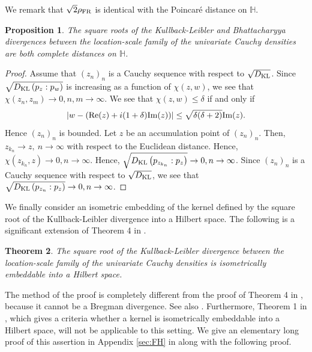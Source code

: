\documentclass[journal]{IEEEtran}
\newtheorem{theorem}{Theorem}
\newtheorem{proposition}[theorem]{Proposition}
\begin{document}
We remark that $\sqrt{2}\rho_{\textup{FR}}$ is identical with the Poincar\'e distance on $\mathbb H$.  



\begin{proposition}\label{prop:complete}
The square roots of the Kullback-Leibler and Bhattacharyya divergences between the location-scale family of the univariate Cauchy densities are both complete distances on $\mathbb H$. 
\end{proposition}

\begin{proof}
Assume that $(z_n)_n$ is a Cauchy sequence with respect to $ \sqrt{D_{\textup{KL}}}$. 
Since $\sqrt{D_{\textup{KL}}\left(p_{z} : p_{w}\right)}$ is increasing as a function of  $\chi(z,w)$, 
we see that 
$\chi(z_n, z_m) \to 0, n,m \to \infty$. 
We see that 
$\chi(z,w) \le \delta$ if and only if 
$$\left|w - (\textup{Re}(z) + i (1+\delta)\textup{Im}(z)) \right| \le \sqrt{\delta (\delta+2)} \textup{Im}(z). $$
Hence $(z_n)_n$ is bounded. 
Let $z$ be an accumulation point of $(z_n)_n$. 
Then, $z_{k_n} \to z, \ n \to \infty$ with respect to the Euclidean distance. 
Hence, 
$\chi(z_{k_n}, z) \to 0, n \to \infty$. 
Hence, 
$\sqrt{D_{\textup{KL}}\left(p_{z_{k_n}} : p_{z}\right)} \to 0, n \to \infty$. 
Since $(z_n)_n$ is a Cauchy sequence with respect to $ \sqrt{D_{\textup{KL}}}$, 
we see that 
$\sqrt{D_{\textup{KL}}\left(p_{z_{n}} : p_{z}\right)} \to 0, n \to \infty$. 
\end{proof}




We finally consider an isometric embedding of the kernel defined by the square root of the Kullback-Leibler divergence into a Hilbert space. 
The following is a significant extension of Theorem 4 in \cite{CauchyVoronoi-2020}. 

\begin{theorem}\label{thm:embeddable}
The square root of the Kullback-Leibler divergence between the location-scale family of the univariate Cauchy densities is isometrically embeddable into a Hilbert space. 
\end{theorem}

The method of the proof is completely different from the proof of Theorem 4 in \cite{CauchyVoronoi-2020}, 
because it cannot be a Bregman divergence. 
See also \cite{acharyya2013bregman}. 
Furthermore, Theorem 1 in \cite{fuglede2004jensen}, which gives a criteria whether a kernel is isometrically embeddable into a Hilbert space, will not be applicable to this setting.   
We give an elementary long proof of this assertion in Appendix \ref{sec:FH} in along with the following proof. 
\end{document}
